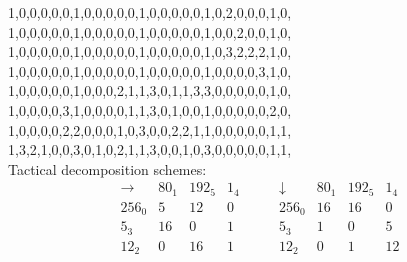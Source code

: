 \begin{mdframed}[style=MyFrame]
{1,0,0,0,0,0,1,0,0,0,0,0,1,0,0,0,0,0,1,0,2,0,0,0,1,0,\\
1,0,0,0,0,0,1,0,0,0,0,0,1,0,0,0,0,0,1,0,0,2,0,0,1,0,\\
1,0,0,0,0,0,1,0,0,0,0,0,1,0,0,0,0,0,1,0,3,2,2,2,1,0,\\
1,0,0,0,0,0,1,0,0,0,0,0,1,0,0,0,0,0,1,0,0,0,0,3,1,0,\\
1,0,0,0,0,0,1,0,0,0,2,1,1,3,0,1,1,3,3,0,0,0,0,0,1,0,\\
1,0,0,0,0,3,1,0,0,0,0,1,1,3,0,1,0,0,1,0,0,0,0,0,2,0,\\
1,0,0,0,0,2,2,0,0,0,1,0,3,0,0,2,2,1,1,0,0,0,0,0,1,1,\\
1,3,2,1,0,0,3,0,1,0,2,1,1,3,0,0,1,0,3,0,0,0,0,0,1,1,\\
}
Tactical decomposition schemes:\\
$$
\begin{array}{r|*{3}{r}}
\rightarrow  &     80_{  1} &    192_{  5} &      1_{  4}\\
\hline
   256_{  0} &            5 &           12 &            0\\
     5_{  3} &           16 &            0 &            1\\
    12_{  2} &            0 &           16 &            1\\
\end{array}
\qquad
\begin{array}{r|*{3}{r}}
\downarrow  &     80_{  1} &    192_{  5} &      1_{  4}\\
\hline
   256_{  0} &           16 &           16 &            0\\
     5_{  3} &            1 &            0 &            5\\
    12_{  2} &            0 &            1 &           12\\
\end{array}
$$
\end{mdframed}







